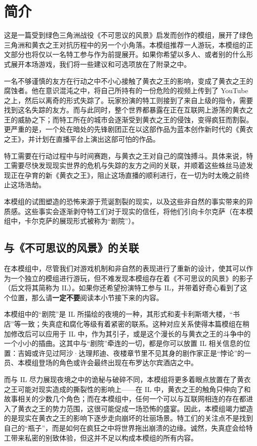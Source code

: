 \section{简介}

这是一篇受到绿色三角洲战役《不可思议的风景》启发而创作的模组，展开了绿色三角洲和黄衣之王对抗历程中的另一个小角落。本模组推荐一人游玩，本模组的正文部分也将仅以一名特工参与作为前提展开。如果你希望以多人、或者别的什么形式展开本场游戏，我们将一些建议和可选项放在了附录之中。

一名不够谨慎的友方在行动之中不小心接触了黄衣之王的影响，变成了黄衣之王的腐蚀者。他在意识混沌之中，将自己所持有的一份危险的视频上传到了 YouTube 之上，然后以离奇的形式失踪了。玩家扮演的特工则接到了来自上级的指令，需要找到这名失踪的友方。而与此同时，整个世界都暴露在正在互联网上游荡的黄衣之王的威胁之下；而特工所在的城市会逐渐受到黄衣之王的侵蚀，变得疯狂而割裂。更严重的是，一个处在暗处的先锋剧团正在以这部作品为蓝本创作新时代的《黄衣之王》，并计划在直播平台上演出这部可怕的作品。

特工需要在行动过程中与时间赛跑，与黄衣之王对自己的腐蚀搏斗。具体来说，特工需要尽快发现现实世界的危机与失踪的友方之间的关联，并顺着这些蛛丝马迹发现正在孕育的新《黄衣之王》，阻止这场直播的顺利进行，在一切为时太晚之前终止这场浩劫。

本模组的试图塑造的恐怖来源于荒诞割裂的现实，以及这些非自然的事实带来的异质感。这些事实会逐渐剥夺特工们对于现实的信任，将他们引向卡尔克萨（在本模组中，卡尔克萨的展现形式被称为“剧院”）。

\subsection{与《不可思议的风景》的关联}

在本模组中，尽管我们对游戏机制和非自然的表现进行了重新的设计，使其可以作为一个独立的模组进行游玩，但不难发现本模组存在着《不可思议的风景》的影子（后文将其简称为 IL）。如果你还希望扮演特工参与 IL，并带着好奇心看到了这个位置，那么请\textbf{一定不要}阅读本小节接下来的内容。

本模组中的“剧院”是 IL 所描绘的夜境的一种，其形式和麦卡利斯塔大楼，“书店”等一致；失真症和腐化等级有着紧密的联系。这种对应关系使得本篇模组在稍加修改后可以应用于 IL 中，作为其引子，或是这个漫长的与黄衣之王的斗争中的一个小小的插曲。这其中与“剧院”牵连的一切，都是你可以放置 IL 相关信息的位置：吉姆或许见过阿沙·达理邦迪、夜楼章节里不见其身的剧作家正是“悖论”的一员、本模组登场的角色或许会最终出现在布罗达尔宾酒店之中。

而与 IL 尽力展现夜境之中的诡秘与破碎不同，本模组将更多着眼点放置在了黄衣之王可能对现实造成的撕裂性的影响上——在 IL 中，黄衣之王的触角只伸向了和故事相关的少数几个角色；而在本模组中，任何一个可以与互联网相连的存在都进入了黄衣之王的势力范围，这很可能促成一场恐怖的盛宴。因此，本模组竭力塑造的是现实在黄衣之王的影响下逐步走向崩坏的壮丽场景。特工们的关注点不是找到自己的“瓶子”，而是如何在疯狂之中将世界拖出崩溃的边缘。诚然，失真症会给特工带来私密的别致体验，但这并不足以构成本模组的所有内容。